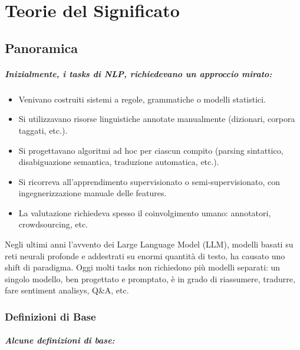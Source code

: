 \chapter{Teorie del Significato}

\section{Panoramica}

\paragraph{Inizialmente, i tasks di NLP, richiedevano un approccio mirato:}

\begin{itemize}
  \item Venivano costruiti sistemi a regole, grammatiche o modelli statistici.
  \item Si utilizzavano risorse linguistiche annotate manualmente (dizionari, corpora taggati, etc.). 
  \item Si progettavano algoritmi ad hoc per ciascun compito (parsing sintattico, disabiguazione semantica, traduzione automatica, etc.).
  \item Si ricorreva all'apprendimento supervisionato o semi-supervisionato, con ingegnerizzazione manuale delle features. 
  \item La valutazione richiedeva spesso il coinvolgimento umano: annotatori, crowdsourcing, etc. 
\end{itemize}


Negli ultimi anni l'avvento dei Large Language Model (LLM), modelli basati su reti neurali profonde e addestrati su enormi quantità di testo, ha causato uno shift di paradigma. Oggi molti tasks non richiedono più modelli separati: un singolo modello, ben progettato e promptato, è in grado di riassumere, tradurre, fare sentiment analisys, Q\&A, etc. 

\subsection{Definizioni di Base}

\paragraph{Alcune definizioni di base:}

